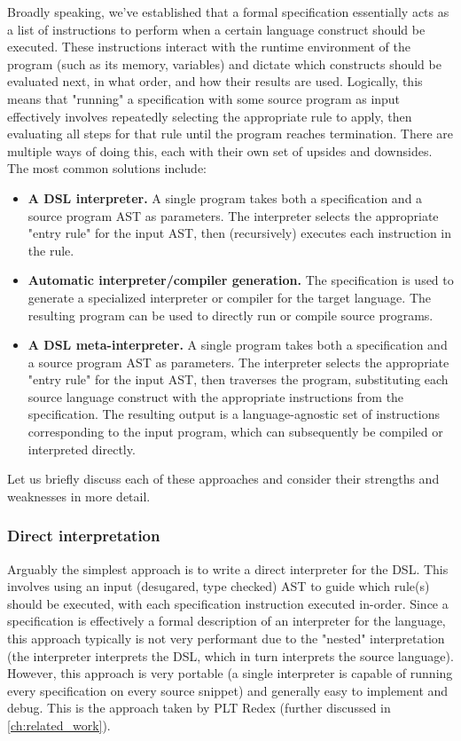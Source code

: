 Broadly speaking, we've established that a formal specification essentially acts as a list of instructions to perform when a certain language construct should be executed. These instructions interact with the runtime environment of the program (such as its memory, variables) and dictate which constructs should be evaluated next, in what order, and how their results are used. Logically, this means that "running" a specification with some source program as input effectively involves repeatedly selecting the appropriate rule to apply, then evaluating all steps for that rule until the program reaches termination. There are multiple ways of doing this, each with their own set of upsides and downsides. The most common solutions include:

\begin{itemize}
  \item \textbf{A \ac{DSL} interpreter.} A single program takes both a specification and a source program AST as parameters. The interpreter selects the appropriate "entry rule" for the input AST, then (recursively) executes each instruction in the rule.
  \item \textbf{Automatic interpreter/compiler generation.} The specification is used to generate a specialized interpreter or compiler for the target language. The resulting program can be used to directly run or compile source programs.
  \item \textbf{A \ac{DSL} meta-interpreter.} A single program takes both a specification and a source program AST as parameters. The interpreter selects the appropriate "entry rule" for the input AST, then traverses the program, substituting each source language construct with the appropriate instructions from the specification. The resulting output is a language-agnostic set of instructions corresponding to the input program, which can subsequently be compiled or interpreted directly.
\end{itemize}

\noindent Let us briefly discuss each of these approaches and consider their strengths and weaknesses in more detail. 

\subsubsection*{Direct interpretation} Arguably the simplest approach is to write a direct interpreter for the \ac{DSL}. This involves using an input (desugared, type checked) \ac{AST} to guide which rule(s) should be executed, with each specification instruction executed in-order. Since a specification is effectively a formal description of an interpreter for the language, this approach typically is not very performant due to the "nested" interpretation (the interpreter interprets the \ac{DSL}, which in turn interprets the source language). However, this approach is very portable (a single interpreter is capable of running every specification on every source snippet) and generally easy to implement and debug. This is the approach taken by PLT Redex \cite{MatthewsFFF04}  (further discussed in \cref{ch:related_work}).

